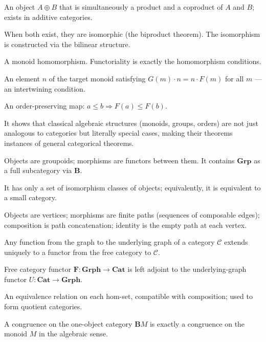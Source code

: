 \begin{exercisesbox}
\begin{qa}
       {An object $A \oplus B$ that is simultaneously a product and a coproduct
        of $A$ and $B$; exists in additive categories.}

       {When both exist, they are isomorphic (the biproduct theorem). The isomorphism
        is constructed via the bilinear structure.}

       {A monoid homomorphism. Functoriality is exactly the homomorphism conditions.}

       {An element $n$ of the target monoid satisfying $G(m) \cdot n = n \cdot F(m)$
        for all $m$ — an intertwining condition.}

       {An order-preserving map: $a \leq b \Rightarrow F(a) \leq F(b)$.}

       {It shows that classical algebraic structures (monoids, groups, orders) are
        not just analogous to categories but literally special cases, making their
        theorems instances of general categorical theorems.}

       {Objects are groupoids; morphisms are functors between them. It contains
        $\mathbf{Grp}$ as a full subcategory via $\mathbf{B}$.}

       {It has only a set of isomorphism classes of objects; equivalently, it is
        equivalent to a small category.}

       {Objects are vertices; morphisms are finite paths (sequences of composable edges);
        composition is path concatenation; identity is the empty path at each vertex.}

       {Any function from the graph to the underlying graph of a category $\mathcal{C}$
        extends uniquely to a functor from the free category to $\mathcal{C}$.}

       {Free category functor $\mathbf{F} : \mathbf{Grph} \to \mathbf{Cat}$ is left
        adjoint to the underlying-graph functor $U : \mathbf{Cat} \to \mathbf{Grph}$.}

       {An equivalence relation on each hom-set, compatible with composition;
        used to form quotient categories.}

       {A congruence on the one-object category $\mathbf{B}M$ is exactly a congruence
        on the monoid $M$ in the algebraic sense.}
\end{qa}
\end{exercisesbox}

